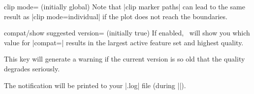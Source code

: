{\begin{pgfplotskey}{clip mode= (initially global)}
	Note that |clip marker paths| can lead to the same result as |clip mode=individual| if the plot does not reach the boundaries.
\end{pgfplotskey}

\begin{pgfplotskey}{compat/show suggested version= (initially true)}
	If enabled, \PGFPlots\ will show you which value for |compat=| results in the largest active feature set and highest quality.
	
	This key will generate a warning if the current version is so old that the quality degrades seriously.

	The notification will be printed to your |.log| file (during ||).
\end{pgfplotskey}
}

